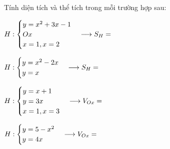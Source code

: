 \begin{vd}
 Tính diện tích và thể tích trong mỗi trường hợp sau:
 \begin{listEX}[2]
 \item $H: \begin{cases} y = x^2 + 3x - 1 \\ Ox \\ x = 1, x = 2 \end{cases} \longrightarrow S_H = \dotfill$
 \item $H: \begin{cases} y = x^2 - 2x \\ y = x \end{cases} \longrightarrow S_H = \dotfill$
 \item $H: \begin{cases} y = x + 1 \\ y = 3x \\ x = 1, x = 3 \end{cases} \longrightarrow V_{Ox} = \dotfill$
 \item $H: \begin{cases} y = 5 - x^2 \\ y = 4x \end{cases} \longrightarrow V_{Ox} = \dotfill$
 \end{listEX}

\end{vd}
